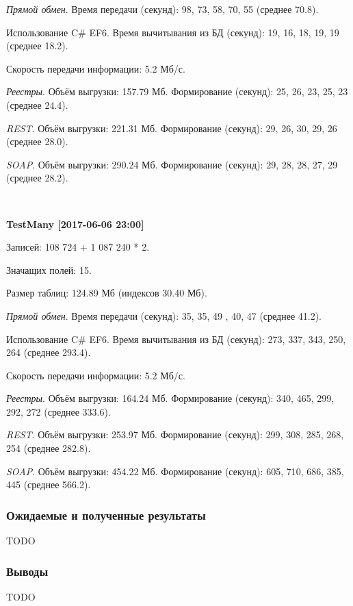 \textit{Прямой обмен}.
Время передачи (секунд): 98, 73, 58, 70, 55 (среднее 70.8).

Использование C\# EF6.
Время вычитывания из БД (секунд): 19, 16, 18, 19, 19 (среднее 18.2).

Скорость передачи информации: 5.2 Мб/с.
	
\textit{Реестры}.
Объём выгрузки: 157.79 Мб.
Формирование (секунд): 25, 26, 23, 25, 23 (среднее 24.4).

\textit{REST}.
Объём выгрузки: 221.31 Мб.
Формирование (секунд): 29, 26, 30, 29, 26 (среднее 28.0).

\textit{SOAP}.
Объём выгрузки: 290.24 Мб.
Формирование (секунд): 29, 28, 28, 27, 29 (среднее 28.2).

~

\textbf{TestMany [2017-06-06 23:00]}

Записей: 108 724 + 1 087 240 * 2.

Значащих полей: 15.

Размер таблиц: 124.89 Мб (индексов 30.40 Мб).

\textit{Прямой обмен}.
Время передачи (секунд): 35, 35, 49 , 40, 47 (среднее 41.2).

Использование C\# EF6.
Время вычитывания из БД (секунд): 273, 337, 343, 250, 264 (среднее 293.4).

Скорость передачи информации: 5.2 Мб/с.

\textit{Реестры}.
Объём выгрузки: 164.24 Мб.
Формирование (секунд): 340, 465, 299, 292, 272 (среднее 333.6).

\textit{REST}.
Объём выгрузки: 253.97 Мб.
Формирование (секунд): 299, 308, 285, 268, 254 (среднее 282.8).

\textit{SOAP}.
Объём выгрузки: 454.22 Мб.
Формирование (секунд): 605, 710, 686, 385, 445 (среднее 566.2).

\subsubsection*{Ожидаемые и полученные результаты}

TODO

\subsubsection*{Выводы}

TODO

\clearpage
\newpage